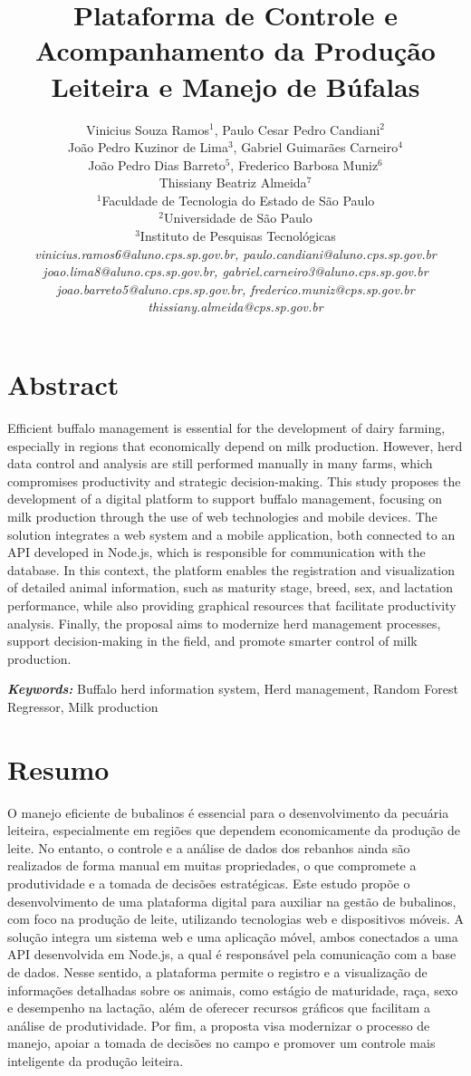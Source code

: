 \documentclass[11pt,a4paper]{article}
\title{\vspace{0.6cm}\textbf{\Large Plataforma de Controle e Acompanhamento da Produção Leiteira e Manejo de Búfalas}}
\author{
    Vinicius Souza Ramos$^{1}$, Paulo Cesar Pedro Candiani$^{2}$ \\
    João Pedro Kuzinor de Lima$^{3}$, Gabriel Guimarães Carneiro$^{4}$ \\
    João Pedro Dias Barreto$^{5}$, Frederico Barbosa Muniz$^{6}$ \\
    Thissiany Beatriz Almeida$^{7}$ \\ [0.3cm]
    \small
    $^{1}$Faculdade de Tecnologia do Estado de São Paulo \\
    $^{2}$Universidade de São Paulo \\
    $^{3}$Instituto de Pesquisas Tecnológicas \\[0.2cm]
    \textit{vinicius.ramos6@aluno.cps.sp.gov.br, paulo.candiani@aluno.cps.sp.gov.br} \\
    \textit{joao.lima8@aluno.cps.sp.gov.br, gabriel.carneiro3@aluno.cps.sp.gov.br} \\
    \textit{joao.barreto5@aluno.cps.sp.gov.br, frederico.muniz@cps.sp.gov.br}\\
    \textit{thissiany.almeida@cps.sp.gov.br}
}
\date{}
\begin{document}
\pagestyle{fancy}

\maketitle
\thispagestyle{fancy}


\section*{Abstract}

Efficient buffalo management is essential for the development of dairy farming, especially in regions that economically depend on milk production. However, herd data control and analysis are still performed manually in many farms, which compromises productivity and strategic decision-making. This study proposes the development of a digital platform to support buffalo management, focusing on milk production through the use of web technologies and mobile devices. The solution integrates a web system and a mobile application, both connected to an API developed in Node.js, which is responsible for communication with the database. In this context, the platform enables the registration and visualization of detailed animal information, such as maturity stage, breed, sex, and lactation performance, while also providing graphical resources that facilitate productivity analysis. Finally, the proposal aims to modernize herd management processes, support decision-making in the field, and promote smarter control of milk production.

\vspace{0.3cm}
\noindent\textit{\textbf{Keywords:}} Buffalo herd information system, Herd management, Random Forest Regressor, Milk production

\vspace{0.2cm}

\section*{Resumo}

O manejo eficiente de bubalinos é essencial para o desenvolvimento da pecuária leiteira, especialmente em regiões que dependem economicamente da produção de leite. No entanto, o controle e a análise de dados dos rebanhos ainda são realizados de forma manual em muitas propriedades, o que compromete a produtividade e a tomada de decisões estratégicas. Este estudo propõe o desenvolvimento de uma plataforma digital para auxiliar na gestão de bubalinos, com foco na produção de leite, utilizando tecnologias web e dispositivos móveis. A solução integra um sistema web e uma aplicação móvel, ambos conectados a uma API desenvolvida em Node.js, a qual é responsável pela comunicação com a base de dados. Nesse sentido, a plataforma permite o registro e a visualização de informações detalhadas sobre os animais, como estágio de maturidade, raça, sexo e desempenho na lactação, além de oferecer recursos gráficos que facilitam a análise de produtividade. Por fim, a proposta visa modernizar o processo de manejo, apoiar a tomada de decisões no campo e promover um controle mais inteligente da produção leiteira.  
\end{document}
